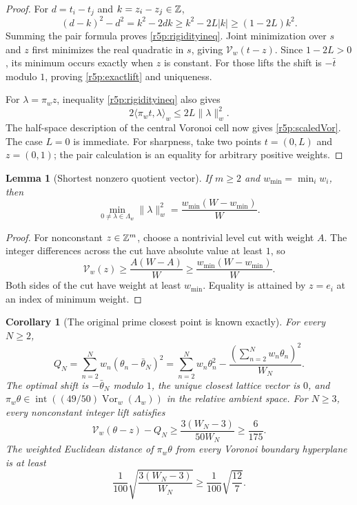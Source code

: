 \documentclass[11pt,a4paper]{article}
\newtheorem{lemma}[theorem]{Lemma}
\newtheorem{corollary}[theorem]{Corollary}
\theoremstyle{definition}\newtheorem{definition}[theorem]{Definition}
\theoremstyle{remark}\newtheorem{remark}[theorem]{Remark}
\numberwithin{equation}{section}
\begin{document}
\begin{proof}
For $d=t_i-t_j$ and $k=z_i-z_j\in\mathbb Z$,
\[
 (d-k)^2-d^2=k^2-2dk
       \geq k^2-2L|k|\geq(1-2L)k^2.
\]
Summing the pair formula proves \eqref{r5p:rigidityineq}.
Joint minimization over $s$ and $z$ first minimizes the real
quadratic in $s$, giving $\mathcal V_w(t-z)$.
Since $1-2L>0$, its minimum occurs exactly when $z$ is constant.
For those lifts the shift is $-\bar t$ modulo $1$, proving
\eqref{r5p:exactlift} and uniqueness.

For $\lambda=\pi_wz$, inequality \eqref{r5p:rigidityineq} also gives
\[
 2\langle\pi_wt,\lambda\rangle_w\leq2L\|\lambda\|_w^2.
\]
The half-space description of the central Voronoi cell now gives
\eqref{r5p:scaledVor}.  The case $L=0$ is immediate.
For sharpness, take two points $t=(0,L)$ and $z=(0,1)$;
the pair calculation is an equality for arbitrary positive weights.
\end{proof}

\begin{lemma}[Shortest nonzero quotient vector]\label{r5p:shortest}
If $m\geq2$ and $w_{\min}=\min_iw_i$, then
\begin{equation}\label{r5p:shortestformula}
 \min_{0\ne\lambda\in\Lambda_w}\|\lambda\|_w^2
       =\frac{w_{\min}(W-w_{\min})}{W}.
\end{equation}
\end{lemma}

\begin{proof}
For nonconstant $z\in\mathbb Z^m$, choose a nontrivial level cut with
weight $A$.  The integer differences across the cut have absolute
value at least $1$, so
\[
 \mathcal V_w(z)\geq\frac{A(W-A)}W
       \geq\frac{w_{\min}(W-w_{\min})}W.
\]
Both sides of the cut have weight at least $w_{\min}$.
Equality is attained by $z=e_i$ at an index of minimum weight.
\end{proof}

\begin{corollary}[The original prime closest point is known exactly]
\label{r5p:primeclosest}
For every $N\geq2$,
\begin{equation}\label{r5p:primevariance}
 \boxed{\displaystyle
 Q_N=\sum_{n=2}^Nw_n(\theta_n-\bar\theta_N)^2
     =\sum_{n=2}^Nw_n\theta_n^2
          -\frac{(\sum_{n=2}^Nw_n\theta_n)^2}{W_N}.}
\end{equation}
The optimal shift is $-\bar\theta_N$ modulo $1$, the unique closest
lattice vector is $0$, and
$\pi_w\theta\in\operatorname{int}((49/50)
\operatorname{Vor}_w(\Lambda_w))$ in the relative ambient space.
For $N\geq3$, every nonconstant integer lift satisfies
\begin{equation}\label{r5p:primegap}
 \mathcal V_w(\theta-z)-Q_N
       \geq\frac{3(W_N-3)}{50W_N}\geq\frac6{175}.
\end{equation}
The weighted Euclidean distance of $\pi_w\theta$ from every
Voronoi boundary hyperplane is at least
\begin{equation}\label{r5p:clearance}
 \frac1{100}\sqrt{\frac{3(W_N-3)}{W_N}}
      \geq\frac1{100}\sqrt{\frac{12}{7}}.
\end{equation}
\end{corollary}
\end{document}
